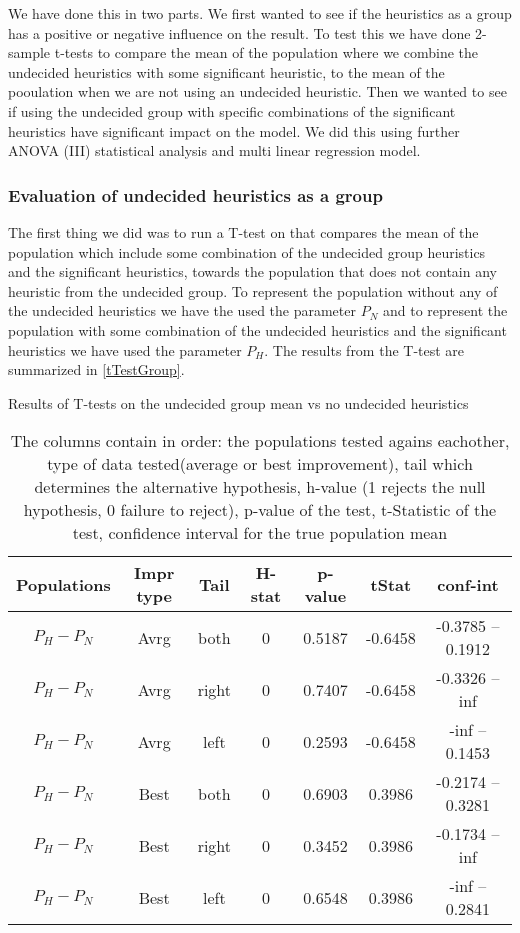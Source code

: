 \documentclass[../main.tex]{subfiles}
\begin{document}
We have done this in two parts.
We first wanted to see if the heuristics as a group has a positive or negative influence on the result. 
To test this we have done 2-sample t-tests to compare the mean of the population where we combine the undecided heuristics with some significant heuristic, to the mean of the pooulation when we are not using an undecided heuristic. 
Then we wanted to see if using the undecided group with specific combinations of the significant heuristics have significant impact on the model. 
We did this using further ANOVA (III) statistical analysis and multi linear regression model.

\subsubsection{Evaluation of undecided heuristics as a group}
The first thing we did was to run a T-test on that compares the mean of the population which include some combination of the undecided group heuristics and the significant heuristics, towards the population that does not contain any heuristic from the undecided group. 
To represent the population without any of the undecided heuristics we have the used the parameter $P_N$ and to represent the population with some combination of the undecided heuristics and the significant heuristics we have used the parameter $P_H$.
The results from the T-test are summarized in \cref{tTestGroup}.

\begin{table}
    \centering
    \caption{Results of T-tests on the undecided group mean vs no undecided heuristics}
        \begin{tabular}{ccccccc}
        \hline
            Populations    & Impr type & Tail   &H-stat   & p-value    & tStat & conf-int \\ 
        \hline                
        $P_H-P_N$   & Avrg  & both  & 0 & 0.5187    & -0.6458   & -0.3785 -- 0.1912\\
        $P_H-P_N$   & Avrg  & right & 0 & 0.7407    & -0.6458   & -0.3326 -- inf   \\
        $P_H-P_N$   & Avrg  & left  & 0 & 0.2593    & -0.6458   & -inf -- 0.1453   \\
        $P_H-P_N$   & Best  & both  & 0 & 0.6903    & 0.3986    & -0.2174 -- 0.3281 \\
        $P_H-P_N$   & Best  & right & 0 & 0.3452    & 0.3986    & -0.1734 -- inf    \\
        $P_H-P_N$   & Best  & left  & 0 & 0.6548    & 0.3986    & -inf -- 0.2841    \\
       \hline
        \end{tabular}
    \caption*{The columns contain in order: the populations tested agains eachother, type of data tested(average or best improvement), tail which determines the alternative hypothesis, h-value (1 rejects the null hypothesis, 0 failure to reject), p-value of the test, t-Statistic of the test, confidence interval for the true population mean}
   \label{tab:tTestGroup}
\end{table}
\end{document}

